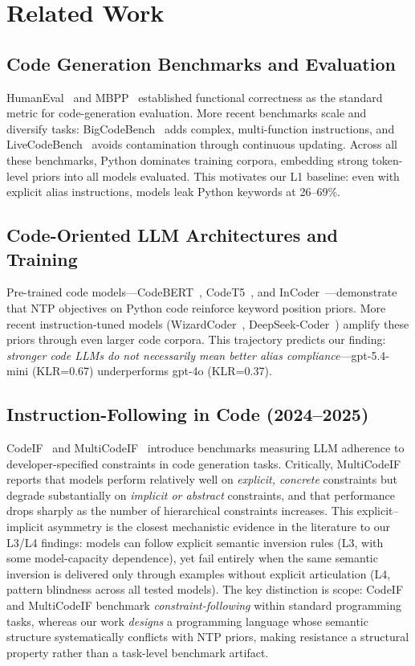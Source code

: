 \section{Related Work}

\subsection{Code Generation Benchmarks and Evaluation}
HumanEval~\cite{chen2021codex} and MBPP~\cite{austin2021program} established functional correctness as the standard metric for code-generation evaluation. More recent benchmarks scale and diversify tasks: BigCodeBench~\cite{bigcodebench2024} adds complex, multi-function instructions, and LiveCodeBench~\cite{livecodebench2024} avoids contamination through continuous updating. Across all these benchmarks, Python dominates training corpora, embedding strong token-level priors into all models evaluated. This motivates our L1 baseline: even with explicit alias instructions, models leak Python keywords at 26--69\%.

\subsection{Code-Oriented LLM Architectures and Training}
Pre-trained code models---CodeBERT~\cite{feng2020codebert}, CodeT5~\cite{wang2021codet5}, and InCoder~\cite{fried2022incoder}---demonstrate that NTP objectives on Python code reinforce keyword position priors. More recent instruction-tuned models (WizardCoder~\cite{luo2023wizardcoder}, DeepSeek-Coder~\cite{guo2024deepseek}) amplify these priors through even larger code corpora. This trajectory predicts our finding: \emph{stronger code LLMs do not necessarily mean better alias compliance}---gpt-5.4-mini (KLR=0.67) underperforms gpt-4o (KLR=0.37).

\subsection{Instruction-Following in Code (2024--2025)}
CodeIF~\cite{codeif2025} and MultiCodeIF~\cite{multicode2025} introduce benchmarks measuring LLM adherence to developer-specified constraints in code generation tasks.
Critically, MultiCodeIF reports that models perform relatively well on \emph{explicit, concrete} constraints but degrade substantially on \emph{implicit or abstract} constraints, and that performance drops sharply as the number of hierarchical constraints increases.
This explicit--implicit asymmetry is the closest mechanistic evidence in the literature to our L3/L4 findings: models can follow explicit semantic inversion rules (L3, with some model-capacity dependence), yet fail entirely when the same semantic inversion is delivered only through examples without explicit articulation (L4, pattern blindness across all tested models).
The key distinction is scope: CodeIF and MultiCodeIF benchmark \emph{constraint-following} within standard programming tasks, whereas our work \emph{designs} a programming language whose semantic structure systematically conflicts with NTP priors, making resistance a structural property rather than a task-level benchmark artifact.


